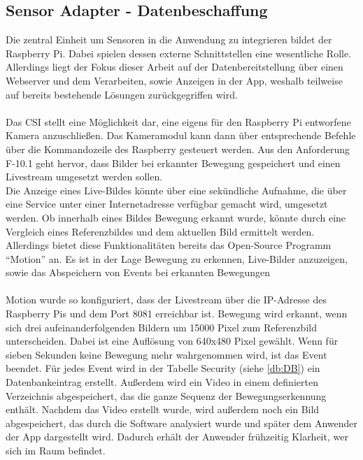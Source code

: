 \subsection{Sensor Adapter - Datenbeschaffung}
Die zentral Einheit um Sensoren in die Anwendung zu integrieren bildet der Raspberry Pi. Dabei spielen dessen externe Schnittstellen eine wesentliche Rolle. Allerdings liegt der Fokus dieser Arbeit auf der Datenbereitstellung über einen Webserver und dem Verarbeiten, sowie Anzeigen in der App, weshalb teilweise auf bereits bestehende Lösungen zurückgegriffen wird.
\\\\Das \acf{CSI} stellt eine Möglichkeit dar, eine eigens für den Raspberry Pi entworfene Kamera anzuschließen. Das Kameramodul kann dann über entsprechende Befehle über die Kommandozeile des Raspberry gesteuert werden. Aus den Anforderung F-10.1 geht hervor, dass Bilder bei erkannter Bewegung gespeichert und einen Livestream umgesetzt werden sollen.\\Die Anzeige eines Live-Bildes könnte über eine sekündliche Aufnahme, die über eine Service unter einer Internetadresse verfügbar gemacht wird, umgesetzt werden. Ob innerhalb eines Bildes Bewegung erkannt wurde, könnte durch eine Vergleich eines Referenzbildes und dem aktuellen Bild ermittelt werden.\\Allerdings bietet diese Funktionalitäten bereits das Open-Source Programm \enquote{Motion} an. Es ist in der Lage Bewegung zu erkennen, Live-Bilder anzuzeigen, sowie das Abspeichern von Events bei erkannten Bewegungen\cite{motion:Motion}\\
\\Motion wurde so konfiguriert, dass der Livestream über die \ac{IP}-Adresse des Raspberry Pis und dem Port 8081 erreichbar ist. Bewegung wird erkannt, wenn sich drei aufeinanderfolgenden Bildern um 15000 Pixel zum Referenzbild unterscheiden. Dabei ist eine Auflösung von 640x480 Pixel gewählt. Wenn für sieben Sekunden keine Bewegung mehr wahrgenommen wird, ist das Event beendet. Für jedes Event wird in der Tabelle Security (siehe \autoref{db:DB}) ein Datenbankeintrag erstellt. Außerdem wird ein Video in einem definierten Verzeichnis abgespeichert, das die ganze Sequenz der Bewegungserkennung enthält. Nachdem das Video erstellt wurde, wird außerdem noch ein Bild abgespeichert, das durch die Software analysiert wurde und später dem Anwender der App dargestellt wird. Dadurch erhält der Anwender frühzeitig Klarheit, wer sich im Raum befindet.
\\\\
